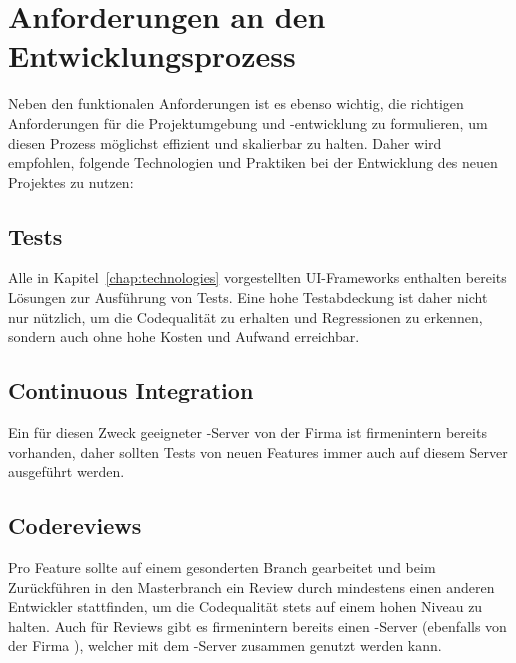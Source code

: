 \section{Anforderungen an den Entwicklungsprozess}
Neben den funktionalen Anforderungen ist es ebenso wichtig, die richtigen Anforderungen für die Projektumgebung und -entwicklung zu formulieren, um diesen Prozess möglichst effizient und skalierbar zu halten. Daher wird empfohlen, folgende Technologien und Praktiken bei der Entwicklung des neuen Projektes zu nutzen:

\subsection{Tests}
Alle in Kapitel~\ref{chap:technologies} vorgestellten UI-Frameworks enthalten bereits Lösungen zur Ausführung von Tests. Eine hohe Testabdeckung ist daher nicht nur nützlich, um die Codequalität zu erhalten und Regressionen zu erkennen, sondern auch ohne hohe Kosten und Aufwand erreichbar.

\subsection{Continuous Integration}
Ein für diesen Zweck geeigneter -Server von der Firma  ist firmenintern bereits vorhanden, daher sollten Tests von neuen Features immer auch auf diesem Server ausgeführt werden.

\subsection{Codereviews}
Pro Feature sollte auf einem gesonderten Branch gearbeitet und beim Zurückführen in den Masterbranch ein Review durch mindestens einen anderen Entwickler stattfinden, um die Codequalität stets auf einem hohen Niveau zu halten. Auch für Reviews gibt es firmenintern bereits einen -Server (ebenfalls von der Firma ), welcher mit dem -Server zusammen genutzt werden kann.

